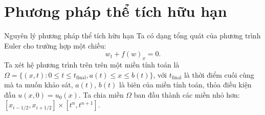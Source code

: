 \documentclass[aspectratio=43,10pt]{beamer}
\renewenvironment{figure}[1][]{}{}
\renewcommand{\caption}[1]{}
\renewcommand{\label}[1]{}
\begin{document}
\section{Phương pháp thể tích hữu hạn}

\begin{frame}{Nguyên lý phương pháp thể tích hữu hạn}
Ta có dạng tổng quát của phương trình Euler cho trường hợp một chiều:
\[
w_t + f(w)_x = 0.
\]
Ta xét hệ phương trình trên trên một miền tính toán là $\Omega = \{(x, t) : 0 \leq t \leq t_{\text{final}}, a(t) \leq x \leq b(t) \}$, với $t_{\text{final}}$ là thời điểm cuối cùng mà ta muốn khảo sát, $a(t)$, $b(t)$ là biên của miền tính toán, thỏa điều kiện đầu $u(x, 0) = u_0(x)$.
Ta chia miền $\Omega$ ban đầu thành các miền nhỏ hơn: $[x_{i - 1/2}, x_{i + 1/2}] \times [t^n, t^{n+1}]$.
    
\begin{center}
\begin{figure}[H]
\centering
{}
\end{figure}
    
\end{center}
\end{frame}
\end{document}

